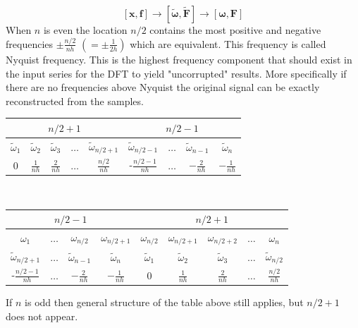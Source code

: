 \begin{equation}
\left[\mathbf{x},\mathbf{f}\right]
\longrightarrow
\left[\boldsymbol{\tilde{\omega}},\mathbf{\tilde{F}}\right]
\longrightarrow
\left[\boldsymbol{\omega},\mathbf{F}\right]
\end{equation}
When $n$ is even the location $n/2$ contains the most positive and negative frequencies
$\pm \frac{n/2}{nh}$ $\left( = \pm \frac{1}{2h} \right)$ which are equivalent.
This frequency is called Nyquist frequency. This is the highest frequency component that
should exist in the input series for the DFT to yield "uncorrupted" results. More
specifically if there are no frequencies above Nyquist the original signal can be exactly
reconstructed from the samples. 
\begin{center}
\begin{tabular}{|c|c|c|c|c|c|c|c|c|}
\multicolumn{5}{c|}{$n/2+1$} & \multicolumn{4}{c}{$n/2-1$} \\
\hline
$\tilde{\omega}_1$ & $\tilde{\omega}_2$ & $\tilde{\omega}_3$ & $\ldots$ & $\tilde{\omega}_{n/2+1}$ & $\tilde{\omega}_{n/2-1}$ & $\ldots$ & 
$\tilde{\omega}_{n-1}$ & $\tilde{\omega}_n$ \\
\hline\hline
$0$ & $\frac{1}{nh}$ & $\frac{2}{nh}$ & $\ldots$ & $\frac{n/2}{nh}$ & -$\frac{n/2-1}{nh}$ & $\ldots$ & $-\frac{2}{nh}$ & $-\frac{1}{nh}$ \\
\hline
\end{tabular}
\\[6mm]
\begin{tabular}{|c|c|c|c|c|c|c|c|c|}
\multicolumn{4}{c|}{$n/2-1$} & \multicolumn{5}{c}{$n/2+1$} \\
\hline
$\omega_1$ & $\ldots$ & $\omega_{n/2}$ & $\omega_{n/2+1}$ & $\omega_{n/2}$ & $\omega_{n/2+1}$ & $\omega_{n/2+2}$ & $\ldots$ & $\omega_n$ \\
\hline\hline
$\tilde{\omega}_{n/2+1}$ & $\ldots$ & $\tilde{\omega}_{n-1}$ & $\tilde{\omega}_{n}$ & $\tilde{\omega}_{1}$ & $\tilde{\omega}_{2}$ & $\tilde{\omega}_3$ & 
$\ldots$ & $\tilde{\omega}_{n/2}$ \\
\hline
-$\frac{n/2-1}{nh}$ & $\ldots$ & $-\frac{2}{nh}$ & $-\frac{1}{nh}$ & $0$ & $\frac{1}{nh}$ & $\frac{2}{nh}$ & $\ldots$ & $\frac{n/2}{nh}$ \\
\hline
\end{tabular}
\end{center}
\vspace{5mm}
If $n$ is odd then general structure of the table above still applies, but $n/2+1$ does not appear. 
